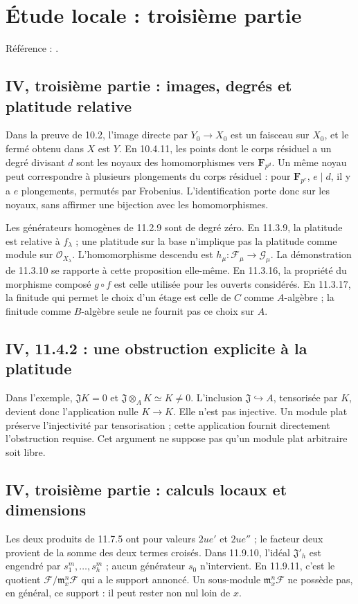 \documentclass[11pt,a4paper]{article}
\begin{document}
\section{Étude locale : troisième partie}
\label{part:iv3}
Référence : \cite{EGAIV3}.
\subsection{IV, troisième partie : images, degrés et platitude relative}
\label{note:iv3-geometry}
Dans la preuve de 10.2, l'image directe par $Y_0\to X_0$ est un
faisceau sur $X_0$, et le fermé obtenu dans $X$ est $Y$.
En 10.4.11, les points dont le corps résiduel a un degré divisant $d$
sont les noyaux des homomorphismes vers $\mathbf F_{p^d}$. Un même noyau
peut correspondre à plusieurs plongements du corps résiduel : pour
$\mathbf F_{p^e}$, $e\mid d$, il y a $e$ plongements, permutés par
Frobenius. L'identification porte donc sur les noyaux, sans affirmer une
bijection avec les homomorphismes.

Les générateurs homogènes de 11.2.9 sont de degré zéro. En 11.3.9,
la platitude est relative à $f_\lambda$ ; une platitude sur la base
n'implique pas la platitude comme module sur $\mathcal O_{X_\lambda}$.
L'homomorphisme descendu est $h_\mu:\mathcal F_\mu\to\mathcal G_\mu$.
La démonstration de 11.3.10 se rapporte à cette proposition elle-même.
En 11.3.16, la propriété du morphisme composé $g\circ f$ est celle
utilisée pour les ouverts considérés. En 11.3.17, la finitude qui
permet le choix d'un étage est celle de $C$ comme $A$-algèbre ; la
finitude comme $B$-algèbre seule ne fournit pas ce choix sur $A$.

\subsection{IV, 11.4.2 : une obstruction explicite à la platitude}
\label{note:iv3-nonflat}
Dans l'exemple, $\mathfrak J K=0$ et
$\mathfrak J\otimes_A K\simeq K\ne0$.
L'inclusion $\mathfrak J\hookrightarrow A$, tensorisée par $K$, devient
donc l'application nulle $K\to K$. Elle n'est pas injective.
Un module plat préserve l'injectivité par tensorisation ; cette
application fournit directement l'obstruction requise.
Cet argument ne suppose pas qu'un module plat arbitraire soit libre.

\subsection{IV, troisième partie : calculs locaux et dimensions}
\label{note:iv3-modules}
Les deux produits de 11.7.5 ont pour valeurs $2ue'$ et $2ue''$ ; le
facteur deux provient de la somme des deux termes croisés.
Dans 11.9.10, l'idéal $\mathfrak J'_h$ est engendré par
$s_1^m,\ldots,s_h^m$ ; aucun générateur $s_0$ n'intervient.
En 11.9.11, c'est le quotient
$\mathcal F/\mathfrak m_x^n\mathcal F$ qui a le support annoncé.
Un sous-module $\mathfrak m_x^n\mathcal F$ ne possède pas, en général,
ce support : il peut rester non nul loin de $x$.
\end{document}
